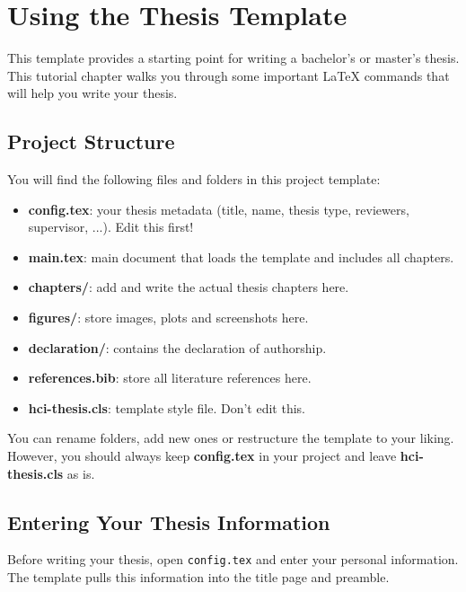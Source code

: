 \chapter{Using the Thesis Template}

This template provides a starting point for writing a bachelor's or master's thesis. This tutorial chapter walks you through some important \LaTeX{} commands that will help you write your thesis.

\section{Project Structure}

You will find the following files and folders in this project template:

\begin{itemize}
    \item \textbf{config.tex}: your thesis metadata (title, name, thesis type, reviewers, supervisor, ...). Edit this first!
    \item \textbf{main.tex}: main document that loads the template and includes all chapters.
    \item \textbf{chapters/}: add and write the actual thesis chapters here.
    \item \textbf{figures/}: store images, plots and screenshots here.
    \item \textbf{declaration/}:  contains the declaration of authorship.
    \item \textbf{references.bib}: store all literature references here.
    \item \textbf{hci-thesis.cls}: template style file. Don't edit this.
\end{itemize}

You can rename folders, add new ones or restructure the template to your liking. However, you should always keep \textbf{config.tex} in your project and leave \textbf{hci-thesis.cls} as is.

\section{Entering Your Thesis Information}

Before writing your thesis, open \texttt{config.tex} and enter your personal information. The template pulls this information into the title page and preamble.

